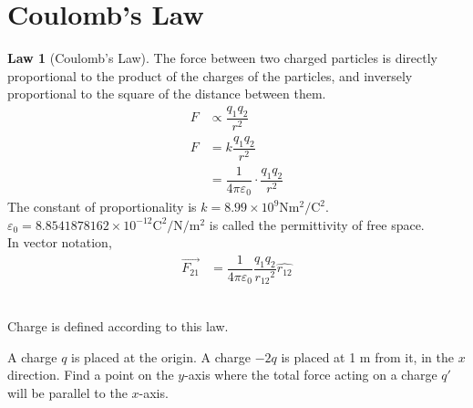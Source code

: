 \documentclass[fleqn, a4paper, 12pt, twoside]{article}
\theoremstyle{definition}
\theoremstyle{theorem}
\newtheorem{law}{Law}
\begin{document}
\section{Coulomb's Law}

\begin{law}[Coulomb's Law]
	The force between two charged particles is directly proportional to the product of the charges of the particles, and inversely proportional to the square of the distance between them.
	\begin{align*}
		F &\propto \dfrac{q_1 q_2}{r^2}\\
		F &= k \dfrac{q_1 q_2}{r^2}\\
		&= \dfrac{1}{4 \pi \varepsilon_0} \cdot \dfrac{q_1 q_2}{r^2}
	\end{align*}
	The constant of proportionality is $k = 8.99 \times 10^9 \si{\newton\metre\squared\per\coulomb\squared}$.\\
	$\varepsilon_0 = 8.8541878162 \times 10^{-12} \si{\coulomb\squared\per\newton\per\metre\squared}$ is called the permittivity of free space.\\
	In vector notation,
	\begin{align*}
		\overrightarrow{F_{2 1}} &= \dfrac{1}{4 \pi \varepsilon_0} \dfrac{q_1 q_2}{{r_{1 2}}^2} \hat{r_{1 2}}
	\end{align*}
\end{law}
~\\
Charge is defined according to this law.\\

\begin{question}
	A charge $q$ is placed at the origin. A charge $-2q$ is placed at 1 \si{\metre} from it, in the $x$ direction. Find a point on the $y$-axis where the total force acting on a charge $q'$ will be parallel to the $x$-axis.\\
\end{question}
\end{document}
